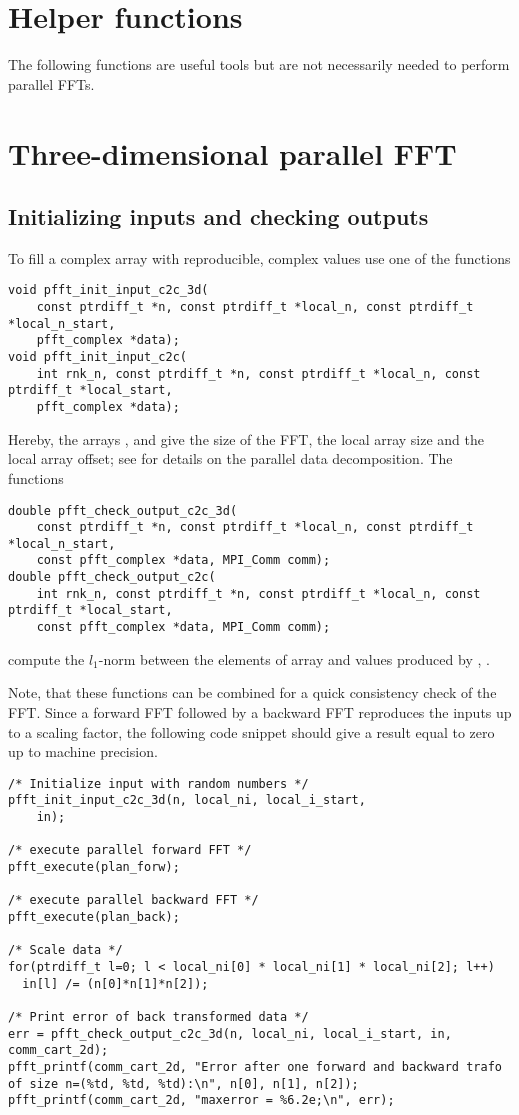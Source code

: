 \section{Helper functions}
The following functions are useful tools but are not necessarily needed to perform parallel FFTs.

\section{Three-dimensional parallel FFT}
\subsection{Initializing inputs and checking outputs}\label{sec:init-data-3d}
To fill a complex array  with reproducible, complex values use one of the functions
\begin{lstlisting}
void pfft_init_input_c2c_3d(
    const ptrdiff_t *n, const ptrdiff_t *local_n, const ptrdiff_t *local_n_start,
    pfft_complex *data);
void pfft_init_input_c2c(
    int rnk_n, const ptrdiff_t *n, const ptrdiff_t *local_n, const ptrdiff_t *local_start,
    pfft_complex *data);
\end{lstlisting}
Hereby, the arrays ,  and  give the size of the FFT, the local array size and the local array offset;
see \cite{sec:par-data-decomp} for details on the parallel data decomposition.
The functions
\begin{lstlisting}
double pfft_check_output_c2c_3d(
    const ptrdiff_t *n, const ptrdiff_t *local_n, const ptrdiff_t *local_n_start,
    const pfft_complex *data, MPI_Comm comm);
double pfft_check_output_c2c(
    int rnk_n, const ptrdiff_t *n, const ptrdiff_t *local_n, const ptrdiff_t *local_start,
    const pfft_complex *data, MPI_Comm comm);
\end{lstlisting}
compute the $l_1$-norm between the elements of array  and values produced by , .

Note, that these functions can be combined for a quick consistency check of the FFT.
Since a forward FFT followed by a backward FFT reproduces the inputs up to a scaling factor, the following code snippet should give a result equal to zero up to machine precision.
\begin{lstlisting}
/* Initialize input with random numbers */
pfft_init_input_c2c_3d(n, local_ni, local_i_start,
    in);

/* execute parallel forward FFT */
pfft_execute(plan_forw);

/* execute parallel backward FFT */
pfft_execute(plan_back);

/* Scale data */
for(ptrdiff_t l=0; l < local_ni[0] * local_ni[1] * local_ni[2]; l++)
  in[l] /= (n[0]*n[1]*n[2]);

/* Print error of back transformed data */
err = pfft_check_output_c2c_3d(n, local_ni, local_i_start, in, comm_cart_2d);
pfft_printf(comm_cart_2d, "Error after one forward and backward trafo of size n=(%td, %td, %td):\n", n[0], n[1], n[2]);
pfft_printf(comm_cart_2d, "maxerror = %6.2e;\n", err);
\end{lstlisting}




